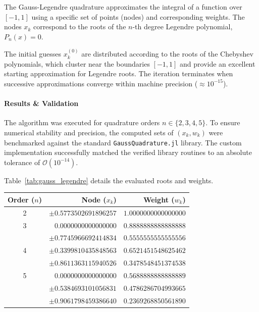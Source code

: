\begin{solution}

	The Gauss-Legendre quadrature approximates the integral of a
	function over $[-1, 1]$ using a specific set of points (nodes) and
	corresponding weights. The nodes $x_k$ correspond to the roots of the $n$-th
	degree Legendre polynomial, $P_n(x) = 0$.

	The initial guesses $x_k^{(0)}$ are distributed according to the roots of the
	Chebyshev polynomials, which cluster near the boundaries $[-1, 1]$ and provide
	an excellent starting approximation for Legendre roots. The iteration
	terminates when successive approximations converge within machine precision
	($\approx 10^{-15}$).

	\paragraph{Results \& Validation}
	The algorithm was executed for quadrature orders $n \in \{2, 3, 4, 5\}$. To
	ensure numerical stability and precision, the computed sets of $(x_k, w_k)$
	were benchmarked against the standard \texttt{GaussQuadrature.jl} library. The
	custom implementation successfully matched the verified library routines to an
	absolute tolerance of $\mathcal{O}(10^{-14})$.

	Table~\ref{tab:gauss_legendre} details the evaluated roots and weights.

	\begin{center}
		\centering
		\label{tab:gauss_legendre}
		\renewcommand{\arraystretch}{1.2}
		\begin{tabular}{crr}
			\toprule
			Order ($n$) & Node ($x_k$)             & Weight ($w_k$)       \\
			\midrule
			2           & $\pm 0.5773502691896257$ & $1.0000000000000000$ \\
			\midrule
			3           & $0.0000000000000000$     & $0.8888888888888888$ \\
			            & $\pm 0.7745966692414834$ & $0.5555555555555556$ \\
			\midrule
			4           & $\pm 0.3399810435848563$ & $0.6521451548625462$ \\
			            & $\pm 0.8611363115940526$ & $0.3478548451374538$ \\
			\midrule
			5           & $0.0000000000000000$     & $0.5688888888888889$ \\
			            & $\pm 0.5384693101056831$ & $0.4786286704993665$ \\
			            & $\pm 0.9061798459386640$ & $0.2369268850561890$ \\
			\bottomrule
		\end{tabular}
	\end{center}


\end{solution}
